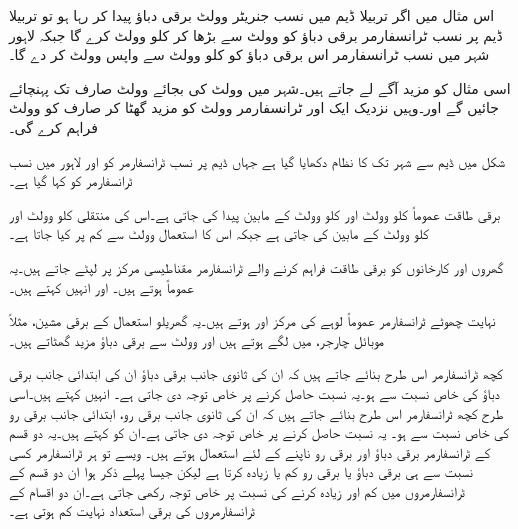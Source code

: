 اس مثال میں اگر تربیلا ڈیم میں نسب جنریٹر  وولٹ برقی دباؤ پیدا کر رہا ہو تو تربیلا ڈیم  پر نسب  ٹرانسفارمر برقی دباؤ کو  وولٹ سے بڑھا کر  کلو وولٹ کرے گا جبکہ لاہور شہر میں نسب  ٹرانسفارمر اس برقی دباؤ کو  کلو وولٹ سے واپس  وولٹ کر دے گا۔

اسی مثال کو مزید آگے لے جاتے ہیں۔شہر میں  وولٹ کی بجائے  وولٹ صارف تک پہنچائے جائیں گے اور۔وہیں نزدیک ایک اور ٹرانسفارمر    وولٹ کو مزید گھٹا کر صارف کو   وولٹ فراہم کرے گی۔ 

شکل  میں ڈیم سے شہر تک کا نظام دکھایا گیا ہے جہاں ڈیم پر نسب ٹرانسفارمر کو   اور لاہور میں نسب ٹرانسفارمر کو   کہا گیا ہے۔

برقی طاقت عموماً  کلو وولٹ اور   کلو وولٹ کے مابین پیدا کی جاتی ہے۔اس کی منتقلی   کلو وولٹ اور   کلو وولٹ کے مابین کی جاتی ہے جبکہ اس کا استعمال   وولٹ سے کم پر کیا جاتا ہے۔

گھروں اور کارخانوں کو برقی طاقت فراہم کرنے والے ٹرانسفارمر مقناطیسی مرکز پر لپٹے جاتے ہیں۔یہ عموماً   ہوتے ہیں۔ اور انہیں  کہتے ہیں۔

نہایت چھوٹے ٹرانسفارمر عموماً لوہے کی مرکز اور  ہوتے ہیں۔یہ گھریلو استعمال کے برقی مشین، مثلاً موبائل چارجر، میں لگے ہوتے ہیں اور  وولٹ سے برقی دباؤ مزید گھٹاتے ہیں۔

کچھ ٹرانسفارمر اس طرح بنائے جاتے ہیں کہ ان کی ثانوی جانب برقی دباؤ ان کی ابتدائی جانب برقی دباؤ کی خاص نسبت سے ہو۔یہ نسبت حاصل کرنے پر خاص توجہ دی جاتی ہے۔ انہیں    کہتے ہیں۔اسی طرح کچھ ٹرانسفارمر اس طرح بنائے جاتے ہیں کہ ان کی ثانوی جانب برقی رو، ابتدائی جانب برقی رو کی خاص نسبت سے ہو۔ یہ نسبت حاصل کرنے پر خاص توجہ دی جاتی ہے۔ان کو   کہتے ہیں۔یہ دو قسم کے ٹرانسفارمر برقی دباؤ اور برقی رو ناپنے کے لئے استعمال ہوتے ہیں۔ ویسے تو ہر ٹرانسفارمر کسی نسبت سے ہی برقی دباؤ یا برقی رو کم یا زیادہ کرتا ہے لیکن جیسا پہلے ذکر ہوا ان دو قسم کے ٹرانسفارمروں میں کم اور زیادہ کرنے کی نسبت پر خاص توجہ رکھی جاتی ہے۔ان دو اقسام کے ٹرانسفارمروں کی برقی استعداد نہایت کم ہوتی ہے۔

